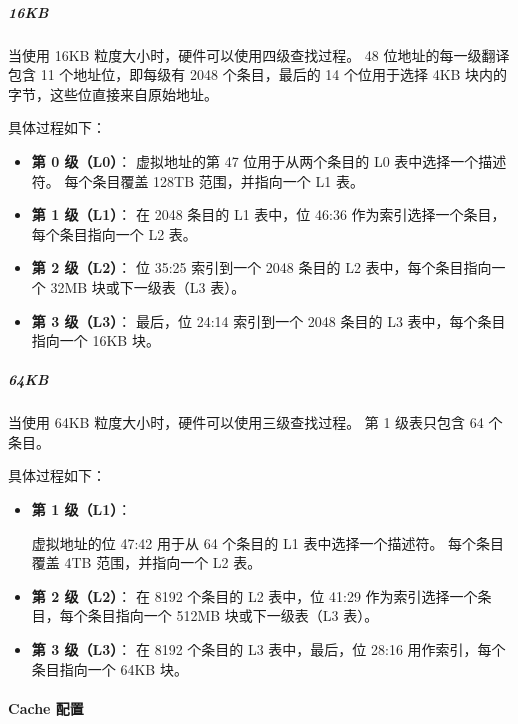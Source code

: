 
\subparagraph*{16KB}

当使用 16KB 粒度大小时，硬件可以使用四级查找过程。
48 位地址的每一级翻译包含 11 个地址位，即每级有 2048 个条目，最后的 14 个位用于选择 4KB 块内的字节，这些位直接来自原始地址。

具体过程如下：

\begin{itemize}
  \item
    \textbf{第 0 级（L0）}：
    虚拟地址的第 47 位用于从两个条目的 L0 表中选择一个描述符。
    每个条目覆盖 128TB 范围，并指向一个 L1 表。
  \item
    \textbf{第 1 级（L1）}：
    在 2048 条目的 L1 表中，位 46:36 作为索引选择一个条目，每个条目指向一个 L2 表。
  \item
    \textbf{第 2 级（L2）}：
    位 35:25 索引到一个 2048 条目的 L2 表中，每个条目指向一个 32MB 块或下一级表（L3 表）。
  \item
    \textbf{第 3 级（L3）}：
    最后，位 24:14 索引到一个 2048 条目的 L3 表中，每个条目指向一个 16KB 块。
\end{itemize}


\subparagraph*{64KB}

当使用 64KB 粒度大小时，硬件可以使用三级查找过程。
第 1 级表只包含 64 个条目。

具体过程如下：

\begin{itemize}
  \item
    \textbf{第 1 级（L1）}：

    虚拟地址的位 47:42 用于从 64 个条目的 L1 表中选择一个描述符。
    每个条目覆盖 4TB 范围，并指向一个 L2 表。
  \item
    \textbf{第 2 级（L2）}：
    在 8192 个条目的 L2 表中，位 41:29 作为索引选择一个条目，每个条目指向一个 512MB 块或下一级表（L3 表）。
  \item
    \textbf{第 3 级（L3）}：
    在 8192 个条目的 L3 表中，最后，位 28:16 用作索引，每个条目指向一个 64KB 块。
\end{itemize}


\paragraph{Cache 配置}


